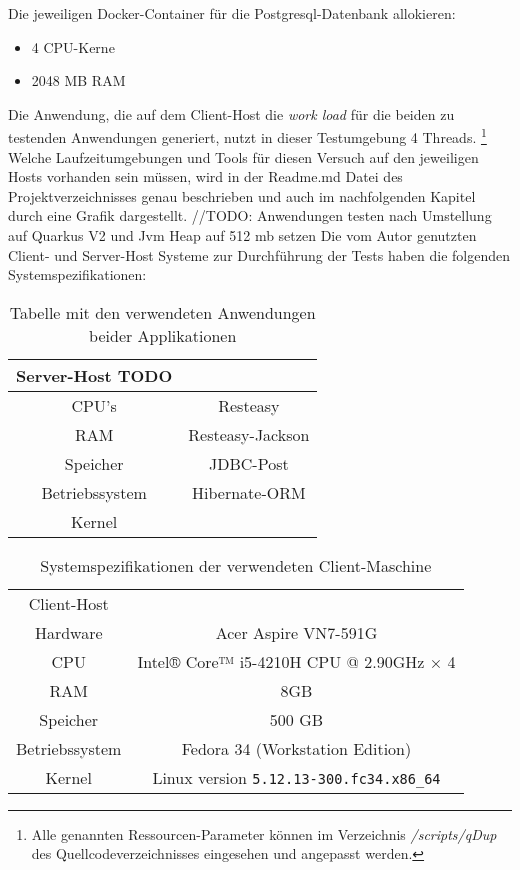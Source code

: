 Die jeweiligen Docker-Container für die Postgresql-Datenbank allokieren:
\begin{itemize}
    \item 4 CPU-Kerne
    \item 2048 MB RAM
\end{itemize}

Die Anwendung, die auf dem Client-Host die \textit{work load} für die beiden zu testenden Anwendungen generiert,
 nutzt in dieser Testumgebung 4 Threads.
\footnote{Alle genannten Ressourcen-Parameter können im Verzeichnis \textit{/scripts/qDup} des Quellcodeverzeichnisses eingesehen und
angepasst werden.}
Welche Laufzeitumgebungen und Tools für diesen Versuch auf den jeweiligen Hosts vorhanden sein müssen, 
wird in der Readme.md Datei des Projektverzeichnisses genau beschrieben und auch im nachfolgenden Kapitel durch eine Grafik dargestellt.
//TODO: Anwendungen testen nach Umstellung auf Quarkus V2 und Jvm Heap auf 512 mb setzen
Die vom Autor genutzten Client- und Server-Host Systeme zur Durchführung der Tests haben die folgenden Systemspezifikationen:

\begin{table}[ht!]
    \centering
    \begin{tabular}{| c | c |}
        \hline
        Server-Host TODO\\
        \hline
        CPU's           & Resteasy         \\
        \hline
        RAM            & Resteasy-Jackson \\
        \hline
        Speicher & JDBC-Post        \\
        \hline
        Betriebssystem         & Hibernate-ORM    \\
        \hline
        Kernel & \\
        \hline
    \end{tabular}
    \caption{Tabelle mit den verwendeten Anwendungen beider Applikationen}
    \label{table:system_host}
\end{table}

\begin{table}[ht!]
    \centering
    \begin{tabular}{| c | c |}
        \hline
        Client-Host\\
        Hardware & Acer Aspire VN7-591G \\
        \hline
        CPU      & Intel® Core™ i5-4210H CPU @ 2.90GHz × 4          \\
        \hline
        RAM      & 8GB \\
        \hline
        Speicher & 500 GB   \\
        \hline
        Betriebssystem  & Fedora 34 (Workstation Edition)   \\
        \hline
        Kernel & Linux version \verb|5.12.13-300.fc34.x86_64| \\
        \hline
    \end{tabular}
    \caption{Systemspezifikationen der verwendeten Client-Maschine}
    \label{table:system_client}
\end{table}

